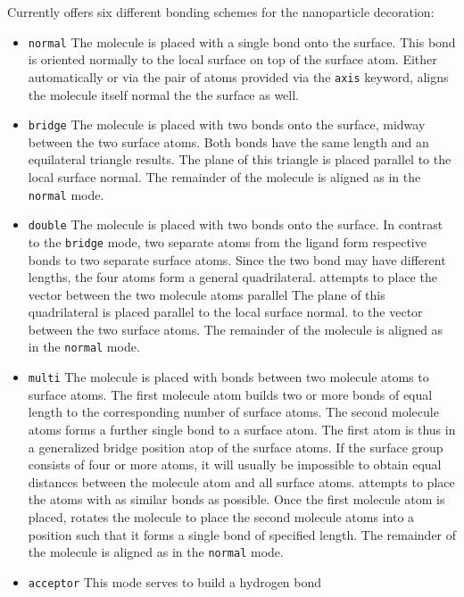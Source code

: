 Currently \Discus offers six different bonding schemes for the 
nanoparticle decoration:
\begin{itemize}
\item {\tt normal} The molecule is placed with a single bond onto the
      surface. This bond is oriented normally to the local surface
      on top of the surface atom.
      Either automatically or via the pair of atoms provided via the
      {\tt axis} keyword, \Discus aligns the molecule itself normal
      the the surface as well.
\item {\tt bridge} The molecule is placed with two bonds onto the
      surface, midway between the two surface atoms. Both bonds 
      have the same length and an equilateral triangle results. 
      The plane of this triangle is placed parallel to the local 
      surface normal.
      The remainder of the molecule is 
      aligned as in the {\tt normal} mode.
\item {\tt double} The molecule is placed with two bonds onto the
      surface. In contrast to the {\tt bridge} mode, two separate
      atoms from the ligand form respective bonds to two separate 
      surface atoms. Since the two bond may have different lengths, 
      the four atoms form a general quadrilateral. \Discus attempts
      to place the vector between the two molecule atoms parallel
      The plane of this quadrilateral is placed parallel to the local 
      surface normal.
      to the vector between the two surface atoms.
      The remainder of the molecule is 
      aligned as in the {\tt normal} mode.
\item {\tt multi} The molecule is placed with bonds between two
      molecule atoms to surface atoms. The first molecule atom
      builds two or more bonds of equal length to the corresponding
      number of surface atoms. The second molecule atoms forms a
      further single bond to a surface atom. The first atom is thus 
      in a generalized bridge position atop of the surface atoms. 
      If the surface group consists of four or more atoms, it will
      usually be impossible to obtain equal distances between the 
      molecule atom and all surface atoms. \Discus attempts to 
      place the atoms with as similar bonds as possible. Once the
      first molecule atom is placed, \Discus rotates the molecule
      to place the second molecule atoms into a position such 
      that it forms a single bond of specified length.
      The remainder of the molecule is 
      aligned as in the {\tt normal} mode.
\item {\tt acceptor} This mode serves to build a hydrogen bond 

\end{itemize}
